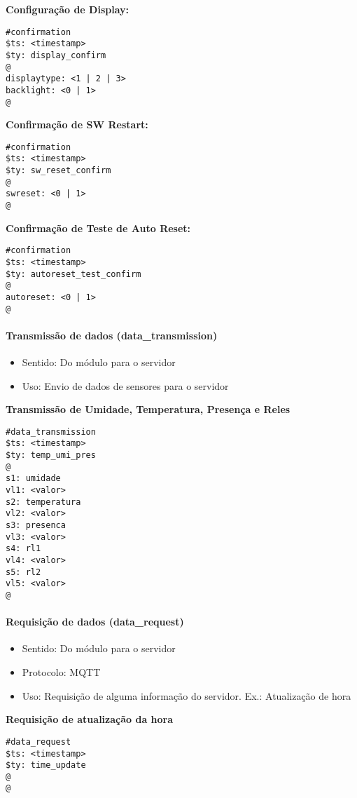 \textbf{Configuração de Display:}
\begin{lstlisting}
#confirmation
$ts: <timestamp>
$ty: display_confirm
@
displaytype: <1 | 2 | 3>
backlight: <0 | 1>
@
\end{lstlisting}

\textbf{Confirmação de SW Restart:}
\begin{lstlisting}
#confirmation
$ts: <timestamp>
$ty: sw_reset_confirm
@
swreset: <0 | 1>
@
\end{lstlisting}

\textbf{Confirmação de Teste de Auto Reset:}
\begin{lstlisting}
#confirmation
$ts: <timestamp>
$ty: autoreset_test_confirm
@
autoreset: <0 | 1>
@
\end{lstlisting}

\paragraph{Transmissão de dados (data\_transmission)}
\begin{itemize}
\item Sentido: Do módulo para o servidor
\item Uso: Envio de dados de sensores para o servidor
\end{itemize}

\textbf{Transmissão de Umidade, Temperatura, Presença e Reles}
\begin{lstlisting}
#data_transmission
$ts: <timestamp>
$ty: temp_umi_pres
@
s1: umidade
vl1: <valor>
s2: temperatura
vl2: <valor>
s3: presenca
vl3: <valor>
s4: rl1
vl4: <valor>
s5: rl2
vl5: <valor>
@
\end{lstlisting}

\paragraph{Requisição de dados (data\_request)}
\begin{itemize}
\item Sentido: Do módulo para o servidor
\item Protocolo: MQTT
\item Uso: Requisição de alguma informação do servidor. Ex.: Atualização de hora
\end{itemize}

\textbf{Requisição de atualização da hora}
\begin{lstlisting}
#data_request
$ts: <timestamp>
$ty: time_update
@
@
\end{lstlisting}

